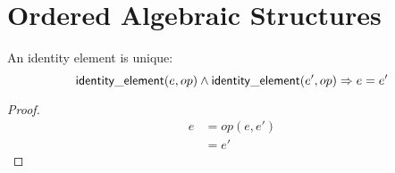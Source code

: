 \chapter{Ordered Algebraic Structures}

\begin{lemma}
	An identity element is unique:
	\[ \mathsf{identity\_element}(e, op) \wedge \mathsf{identity\_element}(e', op) \Rightarrow e = e' \]
\end{lemma}

\begin{proof}
	\begin{align*}
		e &= op(e, e')\\
		  &= e'
	\end{align*}
\end{proof}

